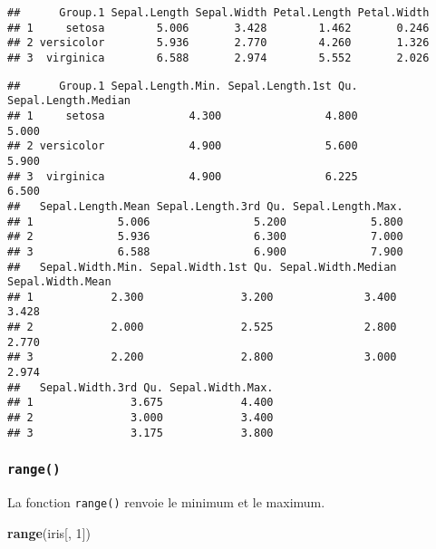 \documentclass[]{book}
\newenvironment{Shaded}{\begin{snugshade}}{\end{snugshade}}
\newcommand{\KeywordTok}[1]{\textcolor[rgb]{0.13,0.29,0.53}{\textbf{#1}}}
\newcommand{\DataTypeTok}[1]{\textcolor[rgb]{0.13,0.29,0.53}{#1}}
\newcommand{\DecValTok}[1]{\textcolor[rgb]{0.00,0.00,0.81}{#1}}
\newcommand{\OperatorTok}[1]{\textcolor[rgb]{0.81,0.36,0.00}{\textbf{#1}}}
\newcommand{\NormalTok}[1]{#1}
\theoremstyle{definition}
\theoremstyle{definition}
\theoremstyle{definition}
\theoremstyle{remark}
\begin{document}
\begin{verbatim}
##      Group.1 Sepal.Length Sepal.Width Petal.Length Petal.Width
## 1     setosa        5.006       3.428        1.462       0.246
## 2 versicolor        5.936       2.770        4.260       1.326
## 3  virginica        6.588       2.974        5.552       2.026
\end{verbatim}

\begin{Shaded}
\end{Shaded}

\begin{verbatim}
##      Group.1 Sepal.Length.Min. Sepal.Length.1st Qu. Sepal.Length.Median
## 1     setosa             4.300                4.800               5.000
## 2 versicolor             4.900                5.600               5.900
## 3  virginica             4.900                6.225               6.500
##   Sepal.Length.Mean Sepal.Length.3rd Qu. Sepal.Length.Max.
## 1             5.006                5.200             5.800
## 2             5.936                6.300             7.000
## 3             6.588                6.900             7.900
##   Sepal.Width.Min. Sepal.Width.1st Qu. Sepal.Width.Median Sepal.Width.Mean
## 1            2.300               3.200              3.400            3.428
## 2            2.000               2.525              2.800            2.770
## 3            2.200               2.800              3.000            2.974
##   Sepal.Width.3rd Qu. Sepal.Width.Max.
## 1               3.675            4.400
## 2               3.000            3.400
## 3               3.175            3.800
\end{verbatim}

\subsubsection{\texorpdfstring{\texttt{range()}}{range()}}\label{l015range}

La fonction \texttt{range()} renvoie le minimum et le maximum.

\begin{Shaded}
\begin{Highlighting}[]
\KeywordTok{range}\NormalTok{(iris[, }\DecValTok{1}\NormalTok{])}
\end{Highlighting}
\end{Shaded}
\end{document}
